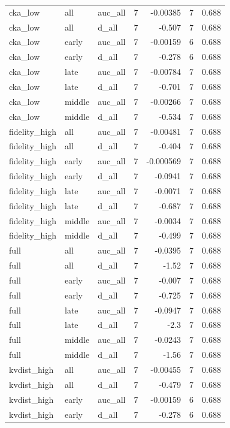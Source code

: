 \begin{table}[t]
\begin{tabular}{lllrrrr}
cka\_low & all & auc\_all & 7 & -0.00385 & 7 & 0.688 \\
cka\_low & all & d\_all & 7 & -0.507 & 7 & 0.688 \\
cka\_low & early & auc\_all & 7 & -0.00159 & 6 & 0.688 \\
cka\_low & early & d\_all & 7 & -0.278 & 6 & 0.688 \\
cka\_low & late & auc\_all & 7 & -0.00784 & 7 & 0.688 \\
cka\_low & late & d\_all & 7 & -0.701 & 7 & 0.688 \\
cka\_low & middle & auc\_all & 7 & -0.00266 & 7 & 0.688 \\
cka\_low & middle & d\_all & 7 & -0.534 & 7 & 0.688 \\
fidelity\_high & all & auc\_all & 7 & -0.00481 & 7 & 0.688 \\
fidelity\_high & all & d\_all & 7 & -0.404 & 7 & 0.688 \\
fidelity\_high & early & auc\_all & 7 & -0.000569 & 7 & 0.688 \\
fidelity\_high & early & d\_all & 7 & -0.0941 & 7 & 0.688 \\
fidelity\_high & late & auc\_all & 7 & -0.0071 & 7 & 0.688 \\
fidelity\_high & late & d\_all & 7 & -0.687 & 7 & 0.688 \\
fidelity\_high & middle & auc\_all & 7 & -0.0034 & 7 & 0.688 \\
fidelity\_high & middle & d\_all & 7 & -0.499 & 7 & 0.688 \\
full & all & auc\_all & 7 & -0.0395 & 7 & 0.688 \\
full & all & d\_all & 7 & -1.52 & 7 & 0.688 \\
full & early & auc\_all & 7 & -0.007 & 7 & 0.688 \\
full & early & d\_all & 7 & -0.725 & 7 & 0.688 \\
full & late & auc\_all & 7 & -0.0947 & 7 & 0.688 \\
full & late & d\_all & 7 & -2.3 & 7 & 0.688 \\
full & middle & auc\_all & 7 & -0.0243 & 7 & 0.688 \\
full & middle & d\_all & 7 & -1.56 & 7 & 0.688 \\
kvdist\_high & all & auc\_all & 7 & -0.00455 & 7 & 0.688 \\
kvdist\_high & all & d\_all & 7 & -0.479 & 7 & 0.688 \\
kvdist\_high & early & auc\_all & 7 & -0.00159 & 6 & 0.688 \\
kvdist\_high & early & d\_all & 7 & -0.278 & 6 & 0.688 \\

\end{tabular}
\end{table}
